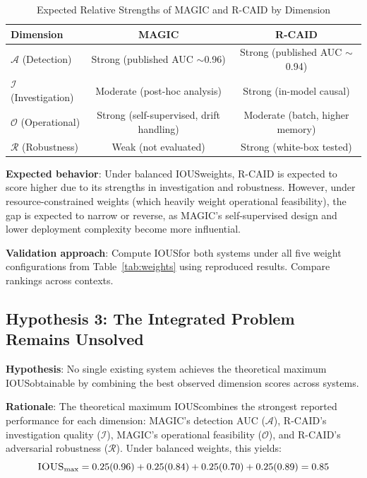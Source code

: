\documentclass[11pt,a4paper]{article}
\newcommand{\ious}{\textsc{IOUS}}
\begin{document}
\begin{table}[H]
\centering
\caption{Expected Relative Strengths of MAGIC and R-CAID by Dimension}
\label{tab:predicted-scores}
\begin{tabular}{@{}lcc@{}}
\toprule
\textbf{Dimension} & \textbf{MAGIC} & \textbf{R-CAID} \\
\midrule
$\mathcal{A}$ (Detection) & Strong (published AUC $\sim$0.96) & Strong (published AUC $\sim$0.94) \\
$\mathcal{I}$ (Investigation) & Moderate (post-hoc analysis) & Strong (in-model causal) \\
$\mathcal{O}$ (Operational) & Strong (self-supervised, drift handling) & Moderate (batch, higher memory) \\
$\mathcal{R}$ (Robustness) & Weak (not evaluated) & Strong (white-box tested) \\
\bottomrule
\end{tabular}
\end{table}

\textbf{Expected behavior}: Under balanced \ious weights, R-CAID is expected to score higher due to its strengths in investigation and robustness. However, under resource-constrained weights (which heavily weight operational feasibility), the gap is expected to narrow or reverse, as MAGIC's self-supervised design and lower deployment complexity become more influential.

\textbf{Validation approach}: Compute \ious for both systems under all five weight configurations from Table~\ref{tab:weights} using reproduced results. Compare rankings across contexts.

\subsection{Hypothesis 3: The Integrated Problem Remains Unsolved}

\textbf{Hypothesis}: No single existing system achieves the theoretical maximum \ious obtainable by combining the best observed dimension scores across systems.

\textbf{Rationale}: The theoretical maximum \ious combines the strongest reported performance for each dimension: MAGIC's detection AUC ($\mathcal{A}$), R-CAID's investigation quality ($\mathcal{I}$), MAGIC's operational feasibility ($\mathcal{O}$), and R-CAID's adversarial robustness ($\mathcal{R}$). Under balanced weights, this yields:
\begin{equation}
\textsc{IOUS}_{\text{max}} = 0.25(0.96) + 0.25(0.84) + 0.25(0.70) + 0.25(0.89) = 0.85
\end{equation}
\end{document}
